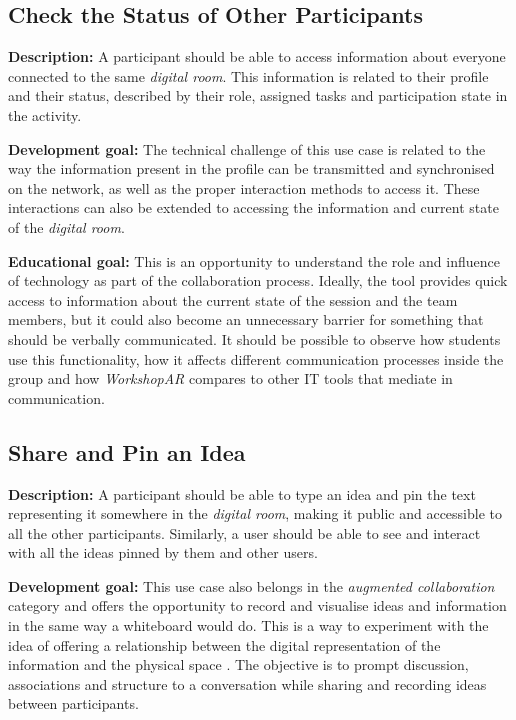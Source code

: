 \subsection{Check the Status of Other Participants \label{sec:4-2-5}}

\textbf{Description:} A participant should be able to access information about everyone connected to  the same \emph{digital room}. This information is related to their
profile and their status, described by their role, assigned tasks and participation state in the activity.

\noindent
\textbf{Development goal:} The technical challenge of this use case is related to the way the information present in the profile can be transmitted and synchronised on the
network, as well as the proper interaction methods to access it. These interactions can also be extended to accessing the information and current state of the \emph{digital room}.

\noindent
\textbf{Educational goal:} This is an opportunity to understand the role and influence of technology as part of the collaboration process. Ideally, the tool provides quick
access to information about the current state of the session and the team members, but it could also become an unnecessary barrier for something that should be verbally
communicated. It should be possible to observe how students use this functionality, how it affects different communication processes inside the group and how \emph{WorkshopAR}
compares to other IT tools that mediate in communication.

\subsection{Share and Pin an Idea \label{sec:4-2-6}}

\textbf{Description:} A participant should be able to type an idea and pin the text representing it somewhere in the \emph{digital room}, making it public and accessible
to all the other participants. Similarly, a user should be able to see and interact with all the ideas pinned by them and other users.

\noindent
\textbf{Development goal:} This use case also belongs in the \emph{augmented collaboration} category and offers the opportunity to record and visualise ideas and
information in the same way a whiteboard would do. This is a way to experiment with the idea of offering a relationship between the digital representation of the
information and the physical space \parencite{zund_2015,wang_2017}. The objective is to prompt discussion, associations and structure to a conversation while sharing and
recording ideas between participants.

